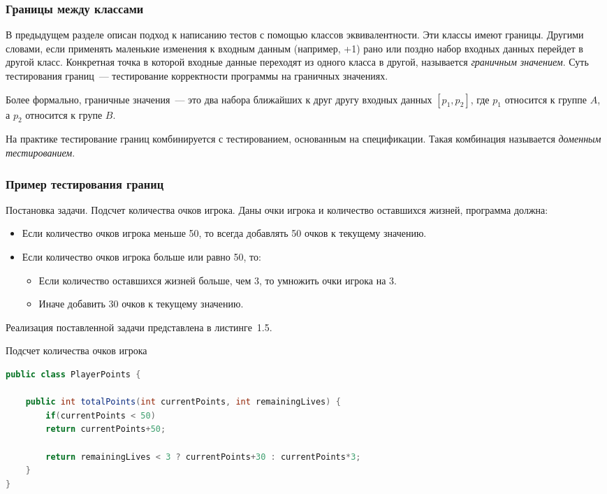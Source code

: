 \subsubsection{Границы между классами} 

В предыдущем разделе описан подход к написанию тестов с помощью классов эквивалентности. Эти классы имеют границы. Другими словами, если применять маленькие изменения к входным данным (например, +1) рано или поздно набор входных данных перейдет в другой класс. Конкретная точка в которой входные данные переходят из одного класса в другой, называется \textit{граничным значением}. Суть тестирования границ~--- тестирование корректности программы на граничных значениях. 

Более формально, граничные значения~--- это два набора ближайших к друг другу входных данных \([p_1, p_2]\), где \(p_1\) относится к группе \(A\), а \(p_2\) относится к групе \(B\).
 
На практике тестирование границ комбинируется с тестированием, основанным на спецификации. Такая комбинация называется \textit{доменным тестированием}.
 
\subsubsection{Пример тестирования границ} 

Постановка задачи. Подсчет количества очков игрока. Даны очки игрока и количество оставшихся жизней, программа должна:

\begin{itemize}
	\item Если количество очков игрока меньше 50, то всегда добавлять 50 очков к текущему значению.
	\item Если количество очков игрока больше или равно 50, то:
	\begin{itemize}
		\item Если количество оставшихся жизней больше, чем 3, то умножить очки игрока на 3.
		\item Иначе добавить 30 очков к текущему значению.
	\end{itemize}
\end{itemize}

Реализация поставленной задачи представлена в листинге~1.5.

\begin{ListingEnv}[!h]%
	\captiondelim{ } %
	\caption{Подсчет количества очков игрока}
	\begin{lstlisting}[language={Java}]
public class PlayerPoints {
	
	public int totalPoints(int currentPoints, int remainingLives) {
		if(currentPoints < 50)
		return currentPoints+50;
		
		return remainingLives < 3 ? currentPoints+30 : currentPoints*3;
	}
}
	\end{lstlisting}
\end{ListingEnv}%

